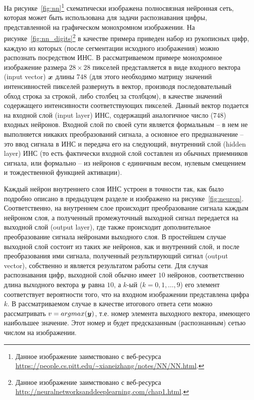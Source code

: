 \documentclass[a4paper,12pt,russian]{article} %
\begin{document}
На рисунке~\ref{fig:nn}\footnote{
	Данное изображение заимствовано с веб-ресурса \url{https://people.cs.pitt.edu/~xianeizhang/notes/NN/NN.html}.
}
схематически изображена полносвязная нейронная сеть, которая может быть использована для задачи распознавания цифры, представленной на графическом монохромном изображении.
На рисунке~\ref{fig:nn_digits}\footnote{
	Данное изображение заимствовано с веб-ресурса \url{http://neuralnetworksanddeeplearning.com/chap1.html}.
}
в качестве примера приведен набор из рукописных цифр, каждую из которых (после сегментации исходного изображения) можно распознать посредством ИНС.
В рассматриваемом примере монохромное изображение размера $28 \times 28$ пикселей представляется в виде входного вектора (input vector) $\bm{x}$ длины $748$ (для этого необходимо матрицу значений интенсивностей пикселей развернуть в вектор, производя последовательный обход строка за строкой, либо столбец за столбцом), в качестве значений содержащего интенсивности соответствующих пикселей.
Данный вектор подается на входной слой (input layer) ИНС, содержащий аналогичное число ($748$) входных нейронов.
Входной слой по своей сути является формальным -- в нем не выполняется никаких преобразований сигнала, а основное его предназначение -- это ввод сигнала в ИНС и передача его на следующий, внутренний слой (hidden layer) ИНС (то есть фактически входной слой составлен из обычных приемников сигнала, или формально -- из нейронов с единичным весом, нулевым смещением и тождественной функцией активации).

Каждый нейрон внутреннего слоя ИНС устроен в точности так, как было подробно описано в предыдущем разделе и изображено на рисунке~\ref{fig:neuron}.
Соответственно, на внутреннем слое происходит преобразование сигнала каждым нейроном слоя, а полученный промежуточный выходной сигнал передается на выходной слой (output layer), где также происходит дополнительное преобразование сигнала нейронами выходного слоя.
В простейшем случае выходной слой состоит из таких же нейронов, как и внутренний слой, и после преобразования ими сигнала, полученный результирующий сигнал (output vector), собственно и является результатом работы сети.
Для случая распознавания цифр, выходной слой обычно имеет $10$ нейронов, соответственно длина выходного вектора $\bm{y}$ равна $10$, а $k$-ый ($k=0, 1, \ldots, 9$) его элемент соответствует вероятности того, что на входном изображении представлена цифра $k$.
В рассматриваемом случае в качестве итогового ответа сети можно рассматривать $v = argmax (\bm{y})$, т.е. номер элемента выходного вектора, имеющего наибольшее значение.
Этот номер и будет предсказанным (распознанным) сетью числом на изображении.
\end{document}
